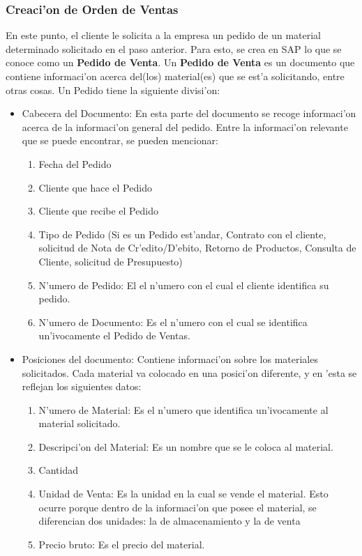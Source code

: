 \subsubsection{Creaci'on de Orden de Ventas}
	En este punto, el cliente le solicita a la empresa un pedido de un material determinado solicitado en el paso anterior. Para esto, se crea en SAP lo que se conoce como un \textbf{Pedido de Venta}. Un \textbf{Pedido de Venta} es un documento que contiene informaci'on acerca del(los) material(es) que se est'a solicitando, entre otras cosas. Un Pedido tiene la siguiente divisi'on:
\begin{itemize}
\item Cabecera del Documento: En esta parte del documento se recoge informaci'on acerca de la informaci'on general del pedido. Entre la informaci'on relevante que se puede encontrar, se pueden mencionar: 
\begin{enumerate}
\item Fecha del Pedido
\item Cliente que hace el Pedido
\item Cliente que recibe el Pedido
\item Tipo de Pedido (Si es un Pedido est'andar, Contrato con el cliente, solicitud de Nota de Cr'edito/D'ebito, Retorno de Productos, Consulta de Cliente, solicitud de Presupuesto)
\item N'umero de Pedido: El el n'umero con el cual el cliente identifica su pedido.
\item N'umero de Documento: Es el n'umero con el cual se identifica un'ivocamente el Pedido de Ventas.
\end{enumerate}
\item Posiciones del documento: Contiene informaci'on sobre los materiales solicitados. Cada material va colocado en una posici'on diferente, y en 'esta se reflejan los siguientes datos:
\begin{enumerate}
\item N'umero de Material: Es el n'umero que identifica un'ivocamente al material solicitado.
\item Descripci'on del Material: Es un nombre que se le coloca al material.
\item Cantidad
\item Unidad de Venta: Es la unidad en la cual se vende el material. Esto ocurre porque dentro de la informaci'on que posee el material, se diferencian dos unidades: la de almacenamiento y la de venta
\item Precio bruto: Es el precio del material.
\end{enumerate}
\end{itemize}

